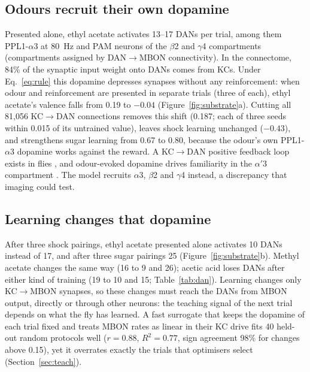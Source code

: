 \documentclass{article}
\begin{document}
\subsection{Odours recruit their own dopamine}\label{sec:selfda}
Presented alone, ethyl acetate activates 13--17 DANs per trial, among them PPL1-$\alpha$3 at 80~Hz and PAM neurons of the $\beta$2 and $\gamma$4 compartments (compartments assigned by DAN$\rightarrow$MBON connectivity). In the connectome, 84\% of the synaptic input weight onto DANs comes from KCs. Under Eq.~\ref{eq:rule} this dopamine depresses synapses without any reinforcement: when odour and reinforcement are presented in separate trials (three of each), ethyl acetate's valence falls from 0.19 to $-0.04$ (Figure~\ref{fig:substrate}a). Cutting all 81{,}056 KC$\rightarrow$DAN connections removes this shift (0.187; each of three seeds within 0.015 of its untrained value), leaves shock learning unchanged ($-0.43$), and strengthens sugar learning from 0.67 to 0.80, because the odour's own PPL1-$\alpha$3 dopamine works against the reward. A KC$\rightarrow$DAN positive feedback loop exists in flies \citep{cervantes2017,li2020}, and odour-evoked dopamine drives familiarity in the $\alpha'$3 compartment \citep{hattori2017}. The model recruits $\alpha$3, $\beta$2 and $\gamma$4 instead, a discrepancy that imaging could test.

\subsection{Learning changes that dopamine}\label{sec:dafeedback}
After three shock pairings, ethyl acetate presented alone activates 10 DANs instead of 17, and after three sugar pairings 25 (Figure~\ref{fig:substrate}b). Methyl acetate changes the same way (16 to 9 and 26); acetic acid loses DANs after either kind of training (19 to 10 and 15; Table~\ref{tab:dan}). Learning changes only KC$\rightarrow$MBON synapses, so these changes must reach the DANs from MBON output, directly or through other neurons: the teaching signal of the next trial depends on what the fly has learned. A fast surrogate that keeps the dopamine of each trial fixed and treats MBON rates as linear in their KC drive fits 40 held-out random protocols well ($r=0.88$, $R^2=0.77$, sign agreement 98\% for changes above 0.15), yet it overrates exactly the trials that optimisers select (Section~\ref{sec:teach}).
\end{document}
